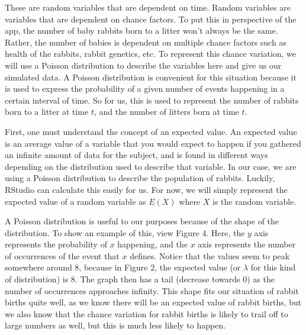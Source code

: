 \documentclass{article}\usepackage[]{graphicx}\usepackage[]{color}
\begin{document}
\noindent These are random variables that are dependent on time. Random variables are variables that are dependent on chance factors. To put this in perspective of the app, the number of baby rabbits born to a litter won't always be the same. Rather, the number of babies is dependent on multiple chance factors such as health of the rabbits, rabbit genetics, etc. To represent this chance variation, we will use a Poisson distribution to describe the variables here and give us our simulated data. A Poisson distribution is convenient for this situation because it is used to express the probability of a given number of events happening in a certain interval of time. So for us, this is used to represent the number of rabbits born to a litter at time \(t\), and the number of litters born at time \(t\). 

First, one must understand the concept of an expected value. An expected value is an average value of a variable that you would expect to happen if you gathered an infinite amount of data for the subject, and is found in different ways depending on the distribution used to describe that variable. In our case, we are using a Poisson distribution to describe the population of rabbits. Luckily, RStudio can calculate this easily for us. For now, we will simply represent the expected value of a random variable as \(E(X)\) where \(X\) is the random variable. 

A Poisson distribution is useful to our purposes because of the shape of the distribution. To show an example of this, view Figure 4. Here, the \(y\) axis represents the probability of \(x\) happening, and the \(x\) axis represents the number of occurrences of the event that \(x\) defines. Notice that the values seem to peak somewhere around 8, because in Figure 2, the expected value (or \(\lambda\) for this kind of distribution) is 8. The graph then has a tail (decrease towards 0) as the number of occurrences approaches infinity. This shape fits our situation of rabbit births quite well, as we know there will be an expected value of rabbit births, but we also know that the chance variation for rabbit births is likely to trail off to large numbers as well, but this is much less likely to happen. 
\end{document}
